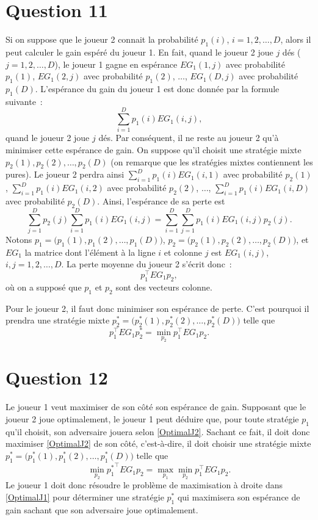 \documentclass[a4paper,11pt]{amsart}
\theoremstyle{plain}
\begin{document}
\section{Question 11}

Si on suppose que le joueur 2 connait la probabilité $p_1(i)$, $i = 1, 2, \dotsc, D$, alors il peut calculer le gain espéré du joueur 1. En fait, quand le joueur 2 joue $j$ dés ($j = 1, 2, \dotsc, D$), le joueur 1 gagne en espérance $EG_1(1, j)$ avec probabilité $p_1(1)$, $EG_1(2, j)$ avec probabilité $p_1(2)$, $\dotsc$, $EG_1(D, j)$ avec probabilité $p_1(D)$. L'espérance du gain du joueur 1 est donc donnée par la formule suivante~:
\[\sum_{i=1}^D p_1(i) EG_1(i, j),\]
quand le joueur 2 joue $j$ dés. Par conséquent, il ne reste au joueur 2 qu'à minimiser cette espérance de gain. On suppose qu'il choisit une stratégie mixte $p_2(1), p_2(2), \dotsc, p_2(D)$ (on remarque que les stratégies mixtes contiennent les pures). Le joueur 2 perdra ainsi $\sum_{i=1}^D p_1(i) EG_1(i, 1)$ avec probabilité $p_2(1)$, $\sum_{i=1}^D p_1(i) EG_1(i, 2)$ avec probabilité $p_2(2)$, $\dotsc$, $\sum_{i=1}^D p_1(i) EG_1(i, D)$ avec probabilité $p_2(D)$. Ainsi, l'espérance de sa perte est
\[
\sum_{j=1}^D p_2(j) \sum_{i=1}^D p_1(i) EG_1(i, j) = \sum_{i=1}^D \sum_{j=1}^D p_1(i) EG_1(i, j) p_2(j).
\]
Notons $p_1 = \bigl(p_1(1), p_1(2), \dotsc, p_1(D)\bigr)$, $p_2 = \bigl(p_2(1), p_2(2), \dotsc, p_2(D)\bigr)$, et $EG_1$ la matrice dont l'élément à la ligne $i$ et colonne $j$ est $EG_1(i, j)$, $i, j = 1, 2, \dotsc, D$. La perte moyenne du joueur 2 s'écrit donc~:
\[
p_1^\top EG_1 p_2,
\]
où on a supposé que $p_1$ et $p_2$ sont des vecteurs colonne.

Pour le joueur 2, il faut donc minimiser son espérance de perte. C'est pourquoi il prendra une stratégie mixte $p_2^\ast = \bigl(p_2^\ast(1), p_2^\ast(2), \dotsc, p_2^\ast(D)\bigr)$ telle que
\begin{equation}
\label{OptimalJ2}
p_1^\top EG_1 p_2^\ast = \min_{p_2} p_1^\top EG_1 p_2.
\end{equation}

\section{Question 12}

Le joueur 1 veut maximiser de son côté son espérance de gain. Supposant que le joueur 2 joue optimalement, le joueur 1 peut déduire que, pour toute stratégie $p_1$ qu'il choisit, son adversaire jouera selon \eqref{OptimalJ2}. Sachant ce fait, il doit donc maximiser \eqref{OptimalJ2} de son côté, c'est-à-dire, il doit choisir une stratégie mixte $p_1^\ast = \bigl(p_1^\ast(1), p_1^\ast(2), \dotsc, p_1^\ast(D)\bigr)$ telle que
\begin{equation}
\label{OptimalJ1}
\min_{p_2} {p_1^\ast}^\top EG_1 p_2 = \max_{p_1} \min_{p_2} p_1^\top EG_1 p_2.
\end{equation}
Le joueur 1 doit donc résoudre le problème de maximisation à droite dans \eqref{OptimalJ1} pour déterminer une stratégie $p_1^\ast$ qui maximisera son espérance de gain sachant que son adversaire joue optimalement.
\end{document}
